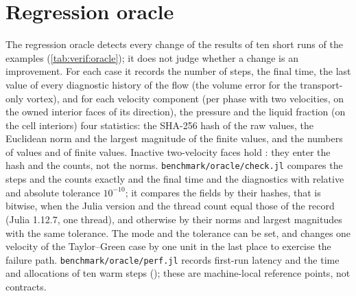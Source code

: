 \section{Regression oracle}\label{sec:verif:oracle}
The regression oracle detects every change of the results of ten short runs
of the examples (\cref{tab:verif:oracle}); it does not judge whether a change
is an improvement. For each case it records the number of steps, the final
time, the last value of every diagnostic history of the flow (the volume
error for the transport-only vortex), and for each velocity component (per
phase with two velocities, on the owned interior faces of its direction), the
pressure and the liquid fraction (on the cell interiors) four statistics: the
SHA-256 hash of the raw values, the Euclidean norm and the largest magnitude
of the finite values, and the numbers of values and of finite values.
Inactive two-velocity faces hold : they enter the hash and the
counts, not the norms. \nolinkurl{benchmark/oracle/check.jl} compares the
steps and the counts exactly and the final time and the diagnostics with
relative and absolute tolerance $10^{-10}$; it compares the fields by their
hashes, that is bitwise, when the Julia version and the thread count equal
those of the record (Julia 1.12.7, one thread), and otherwise by their norms
and largest magnitudes with the same tolerance. The mode and the tolerance
can be set, and  changes one velocity of
the Taylor--Green case by one unit in the last place to exercise the failure
path. \nolinkurl{benchmark/oracle/perf.jl} records first-run latency and the time
and allocations of ten warm steps (); these are
machine-local reference points, not contracts.

